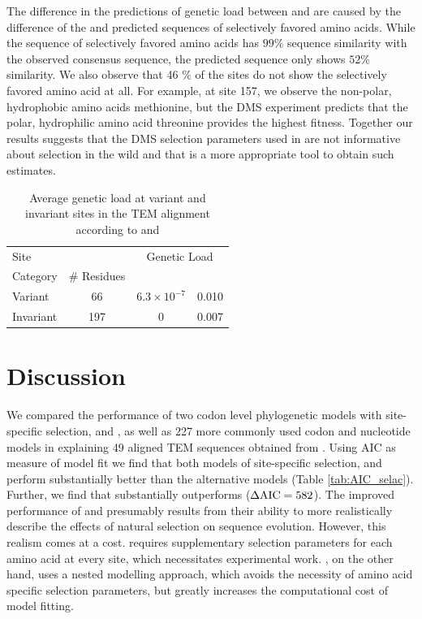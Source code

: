 \documentclass[fleqn,letterpaper]{article}
\begin{document}
The difference in the predictions of genetic load between \selac and \phydms are caused by the difference of the \selac and \phydms predicted sequences of selectively favored amino acids.
While the \selac sequence of selectively favored amino acids has $99 \%$ sequence similarity with the observed consensus sequence, the \phydms predicted sequence only shows $52 \%$ similarity.
We also observe that 46 \% of the sites do not show the selectively favored amino acid at all.
For example, at site 157, we observe the non-polar, hydrophobic amino acids methionine, but the DMS experiment predicts that the polar, hydrophilic amino acid threonine provides the highest fitness.
Together our results suggests that the DMS selection parameters used in \phydms are not informative about selection in the wild and that \selac is a more appropriate tool to obtain such estimates.

\begin{table}
  \centering
  \caption{Average genetic load at variant and invariant sites in the TEM alignment according to \selac and \phydms}
  \begin{tabular}{lccc}
    \hline
	Site		& 		& \multicolumn{2}{c}{Genetic Load}  \\ 
    Category 		& \# Residues	& \multicolumn{1}{c}{\selac} & \multicolumn{1}{c}{\phydms} \\ \hline 
    Variant	&	66	& $6.3\times10^{-7}$ & 0.010  \\
    Invariant		& 	197	& 0 & 0.007 \\ \hline
  \end{tabular}
  \label{tab:selection}
\end{table}


\section{Discussion}
We compared the performance of two codon level phylogenetic models with site-specific selection, \phydms and \selac, as well as 227 more commonly used codon and nucleotide models in explaining 49 aligned TEM sequences obtained from \citet{bloom2017}.
Using AIC as measure of model fit we find that both models of site-specific selection, \phydms and \selac perform substantially better than the alternative models (Table \ref{tab:AIC_selac}).
Further, we find that \selac substantially outperforms \phydms ($\Delta\text{AIC} = 582$).
The improved performance of \phydms and \selac presumably results from their ability to more realistically describe the effects of natural selection on sequence evolution.
However, this realism comes at a cost. 
\phydms requires supplementary selection parameters for each amino acid at every site, which necessitates experimental work.
\selac, on the other hand, uses a nested modelling approach, which avoids the necessity of amino acid specific selection parameters, but greatly increases the computational cost of model fitting.
\end{document}
